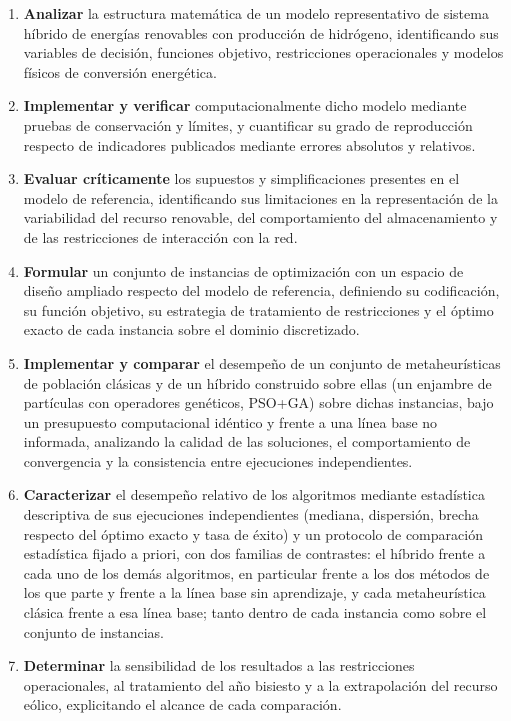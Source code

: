 \begin{enumerate}

\item \textbf{Analizar} la estructura matemática de un modelo representativo de sistema híbrido de energías renovables con producción de hidrógeno, identificando sus variables de decisión, funciones objetivo, restricciones operacionales y modelos físicos de conversión energética.

\item \textbf{Implementar y verificar} computacionalmente dicho modelo mediante pruebas de conservación y límites, y cuantificar su grado de reproducción respecto de indicadores publicados mediante errores absolutos y relativos.

\item \textbf{Evaluar críticamente} los supuestos y simplificaciones presentes en el modelo de referencia, identificando sus limitaciones en la representación de la variabilidad del recurso renovable, del comportamiento del almacenamiento y de las restricciones de interacción con la red.

\item \textbf{Formular} un conjunto de instancias de optimización con un espacio de diseño ampliado respecto del modelo de referencia, definiendo su codificación, su función objetivo, su estrategia de tratamiento de restricciones y el óptimo exacto de cada instancia sobre el dominio discretizado.

\item \textbf{Implementar y comparar} el desempeño de un conjunto de metaheurísticas de población clásicas y de un híbrido construido sobre ellas (un enjambre de partículas con operadores genéticos, PSO+GA) sobre dichas instancias, bajo un presupuesto computacional idéntico y frente a una línea base no informada, analizando la calidad de las soluciones, el comportamiento de convergencia y la consistencia entre ejecuciones independientes.

\item \textbf{Caracterizar} el desempeño relativo de los algoritmos mediante estadística descriptiva de sus ejecuciones independientes (mediana, dispersión, brecha respecto del óptimo exacto y tasa de éxito) y un protocolo de comparación estadística fijado a priori, con dos familias de contrastes: el híbrido frente a cada uno de los demás algoritmos, en particular frente a los dos métodos de los que parte y frente a la línea base sin aprendizaje, y cada metaheurística clásica frente a esa línea base; tanto dentro de cada instancia como sobre el conjunto de instancias.

\item \textbf{Determinar} la sensibilidad de los resultados a las restricciones operacionales, al tratamiento del año bisiesto y a la extrapolación del recurso eólico, explicitando el alcance de cada comparación.

\end{enumerate}
